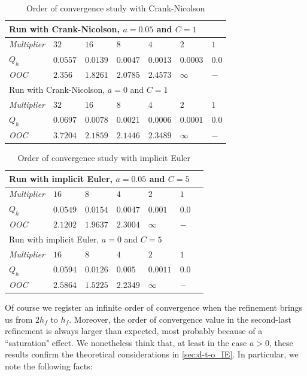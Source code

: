 \documentclass[english,a4paper,9pt,oneside]{scrbook}	%
\theoremstyle{break}
\theoremstyle{remark}
\begin{document}
\begin{table}[h]
\centering
\begin{tabular}{lllllll}
\hline
\multicolumn{7}{l}{Run with Crank-Nicolson, $a = 0.05$ and $C = 1$} \\ \hline
\textit{Multiplier} & $32$ & $16$ & $8$ & $4$ & $2$ & $1$\\ \hline
$Q_h$ & $0.0557$ & $0.0139$ & $0.0047$ & $0.0013$ & $0.0003$ & $0.0$\\ \hline
\textit{OOC} & $2.356$ & $1.8261$ & $2.0785$ & $2.4573$ & $\infty$ & $-$ \\ \hline
\hline
\multicolumn{7}{l}{Run with Crank-Nicolson, $a = 0$ and $C=1$} \\ \hline
\textit{Multiplier} & $32$ & $16$ & $8$ & $4$ & $2$ & $1$\\ \hline
$Q_h$ & $0.0697$ & $0.0078$ & $0.0021$ & $0.0006$ & $0.0001$ & $0.0$\\ \hline
\textit{OOC} & $3.7204$ & $2.1859$ & $2.1446$ & $2.3489$ & $\infty$ & $-$ \\ \hline
\end{tabular}
\caption{Order of convergence study with Crank-Nicolson}\label{tab:ooc_CN}
\end{table}


\begin{table}[h]
\centering
\begin{tabular}{lllllll}
\hline
\multicolumn{6}{l}{Run with implicit Euler, $a = 0.05$ and $C=5$} \\ \hline
\textit{Multiplier} & $16$ & $8$ & $4$ & $2$ & $1$\\ \hline
$Q_h$ & $0.0549$ & $0.0154$ & $0.0047$ & $0.001$ & $0.0$\\ \hline
\textit{OOC} & $2.1202$ & $1.9637$ & $2.3004$ & $\infty$ & $-$ \\ \hline
\hline
\multicolumn{6}{l}{Run with implicit Euler, $a = 0$ and $C=5$} \\ \hline
\textit{Multiplier} & $16$ & $8$ & $4$ & $2$ & $1$\\ \hline
$Q_h$ & $0.0594$ & $0.0126$ & $0.005$ & $0.0011$ & $0.0$\\ \hline
\textit{OOC} & $2.5864$ & $1.5225$ & $2.2349$ & $\infty$ & $-$ \\ \hline
\end{tabular}
\caption{Order of convergence study with implicit Euler}\label{tab:ooc_IE}
\end{table}

Of course we register an infinite order of convergence when the refinement brings us from $2h_f$ to $h_f$. Moreover, the order of convergence value in the second-last refinement is always larger than expected, most probably because of a ``saturation" effect. We nonetheless think that, at least in the case $a>0$, these results confirm the theoretical considerations in  \cref{sec:d-t-o_IE}. In particular, we note the following facts:
\end{document}
